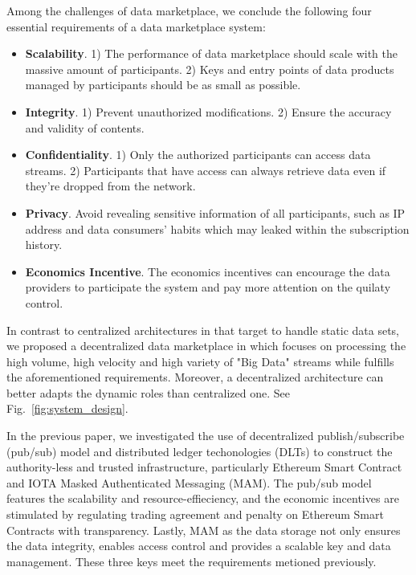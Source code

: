 \documentclass[conference]{IEEEtran}
\begin{document}
Among the challenges of data marketplace\cite{BigDataMarket}, we conclude the following four essential requirements of a data marketplace system:
\begin{itemize}
	\item \textbf{Scalability}. 
1) The performance of data marketplace should scale with the massive amount of participants. 2) Keys and entry points of data products managed by participants should be as small as possible. 
	\item \textbf{Integrity}. 1) Prevent unauthorized modifications. 2) Ensure the accuracy and validity of contents.	
	\item \textbf{Confidentiality}. 
1) Only the authorized participants can access data streams. 2) Participants that have access can always retrieve data even if they're dropped from the network.	
	\item \textbf{Privacy}. Avoid revealing sensitive information of all participants, such as IP address and data consumers' habits which may leaked within the subscription history.
	\item \textbf{Economics Incentive}. The economics incentives can encourage the data providers to participate the system and pay more attention on the quilaty control. 
\end{itemize}

In contrast to centralized architectures in \cite{DIaas, IOTAIdustryMarketplace, MARSA} that target to handle static data sets, we proposed a decentralized data marketplace in \cite{MyDataMarketplace} which focuses on processing the high volume, high velocity and high variety of "Big Data" streams\cite{BigData} while fulfills the aforementioned requirements. Moreover, a decentralized architecture can better adapts the dynamic roles than centralized one. See Fig.~\ref{fig:system_design}.

In the previous paper, we investigated the use of decentralized publish/subscribe (pub/sub) model and distributed ledger techonologies (DLTs) to construct the authority-less and trusted infrastructure, particularly Ethereum Smart Contract\cite{smartContract} and IOTA Masked Authenticated Messaging (MAM)\cite{MAM}. The pub/sub model features the scalability and resource-effieciency, and the economic incentives are stimulated by regulating trading agreement and penalty on Ethereum Smart Contracts with transparency. Lastly, MAM as the data storage not only ensures the data integrity, enables access control and provides a scalable key and data management. These three keys meet the requirements metioned previously.   
\end{document}

